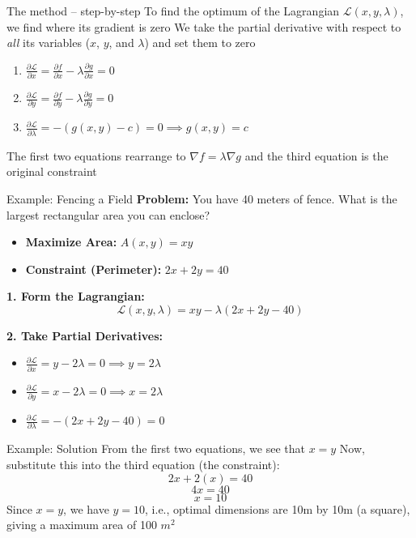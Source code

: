 \documentclass[aspectratio=169]{beamer}\usepackage[]{graphicx}\usepackage[]{xcolor}
\begin{document}
\begin{frame}{The method -- step-by-step}
  To find the optimum of the Lagrangian $\mathcal{L}(x, y, \lambda)$, we find where its gradient is zero
  \vfill
  We take the partial derivative with respect to \textit{all} its variables ($x$, $y$, and $\lambda$) and set them to zero
  \vfill
  \begin{enumerate}
    \item $\frac{\partial \mathcal{L}}{\partial x} = \frac{\partial f}{\partial x} - \lambda \frac{\partial g}{\partial x} = 0$
    \item $\frac{\partial \mathcal{L}}{\partial y} = \frac{\partial f}{\partial y} - \lambda \frac{\partial g}{\partial y} = 0$
    \item $\frac{\partial \mathcal{L}}{\partial \lambda} = -(g(x, y) - c) = 0 \implies g(x, y) = c$
  \end{enumerate}
  \vfill
  The first two equations rearrange to $\nabla f = \lambda \nabla g$ and the third equation is the original constraint
\end{frame}

\begin{frame}{Example: Fencing a Field}
  \textbf{Problem:} You have 40 meters of fence. What is the largest rectangular area you can enclose?
  
  \begin{itemize}
    \item \textbf{Maximize Area:} $A(x, y) = xy$
    \item \textbf{Constraint (Perimeter):} $2x + 2y = 40$
  \end{itemize}
  
  \textbf{1. Form the Lagrangian:}
  $$ \mathcal{L}(x, y, \lambda) = xy - \lambda(2x + 2y - 40) $$
  
  \textbf{2. Take Partial Derivatives:}
  \begin{itemize}
    \item $\frac{\partial \mathcal{L}}{\partial x} = y - 2\lambda = 0 \implies y = 2\lambda$
    \item $\frac{\partial \mathcal{L}}{\partial y} = x - 2\lambda = 0 \implies x = 2\lambda$
    \item $\frac{\partial \mathcal{L}}{\partial \lambda} = -(2x + 2y - 40) = 0$
  \end{itemize}
\end{frame}

\begin{frame}{Example: Solution}
  From the first two equations, we see that $x = y$
  \vfill
  Now, substitute this into the third equation (the constraint):
  $$ 2x + 2(x) = 40 $$
  $$ 4x = 40 $$
  $$ x = 10 $$
  \vfill
  Since $x=y$, we have $y=10$, i.e., optimal dimensions are 10m by 10m (a square), giving a maximum area of 100 $m^2$
\end{frame}




\end{document}
